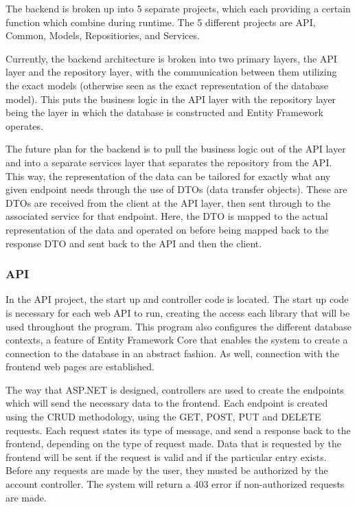 {{{{{{{{{{The backend is broken up into 5 separate projects, which each providing a certain function which combine during runtime. The 5 different projects are API, Common, Models, Repositiories, and Services. 
\newline
{\setlength{\parindent}{0cm}
 
Currently, the backend architecture is broken into two primary layers, the API layer and the repository layer, with the communication between them utilizing the exact models (otherwise seen as the exact representation of the database model). This puts the business logic in the API layer with the repository layer being the layer in which the database is constructed and Entity Framework operates.
\newline
{\setlength{\parindent}{0cm}

The future plan for the backend is to pull the business logic out of the API layer and into a separate services layer that separates the repository from the API. This way, the representation of the data can be tailored for exactly what any given endpoint needs through the use of DTOs (data transfer objects). These are DTOs are received from the client at the API layer, then sent through to the associated service for that endpoint. Here, the DTO is mapped to the actual representation of the data and operated on before being mapped back to the response DTO and sent back to the API and then the client.
 
\subsubsection{API}
In the API project, the start up and controller code is located. The start up code is necessary for each web API to run, creating the access each library that will be used throughout the program. This program also configures the different database contexts, a feature of Entity Framework Core that enables the system to create a connection to the database in an abstract fashion. As well, connection with the frontend web pages are established. 
\newline
{\setlength{\parindent}{0cm} 

The way that ASP.NET is designed, controllers are used to create the endpoints which will send the necessary data to the frontend. Each endpoint is created using the CRUD methodology, using the GET, POST, PUT and DELETE requests. Each request states its type of message, and send a response back to the frontend, depending on the type of request made. Data that is requested by the frontend will be sent if the request is valid and if the particular entry exists. Before any requests are made by the user, they musted be authorized by the account controller. The system will return a 403 error if non-authorized requests are made. 

}}}}}}}}}}}}}
